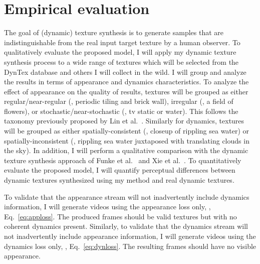 \section{Empirical evaluation}

The goal of (dynamic) texture synthesis is to generate 
samples that are indistinguishable from the real input target
texture by a human observer. To qualitatively evaluate the proposed model, I will apply my dynamic texture synthesis process 
to a wide range of textures which will be selected from the 
DynTex \cite{peteri2010} database and others I will collect in
the wild. I will group and analyze the results in terms of appearance and dynamics characteristics. To analyze the effect of appearance on the quality of results, textures will be grouped as either regular/near-regular (\eg, periodic tiling and brick wall), irregular (\eg, a field of flowers), or stochastic/near-stochastic (\eg, tv static or water). This follows the taxonomy previously proposed by Lin et al.\ \cite{lin2006quantitative}. Similarly for dynamics, textures will be grouped as either spatially-consistent (\eg, closeup of rippling sea water) or spatially-inconsistent (\eg, rippling sea water juxtaposed 
with translating clouds in the sky). In addition, I will perform a qualitative comparison with the dynamic texture synthesis approach of Funke et al.\ \cite{funke2017} and Xie et al.\ 
\cite{xie2017synthesizing}. To quantitatively evaluate the proposed model, I will 
quantify perceptual differences between dynamic textures synthesized using my method and real dynamic textures.

To validate that the appearance stream will not inadvertently include dynamics information, I will generate videos using the appearance loss only, \ie,
Eq.\ \ref{eq:apploss}. The produced frames should be valid textures but
with no coherent dynamics present. Similarly, to validate that the dynamics stream will not 
inadvertently include appearance information, I will generate videos
using the dynamics loss only, \ie, Eq.\ \ref{eq:dynloss}. The resulting frames should have no visible appearance.